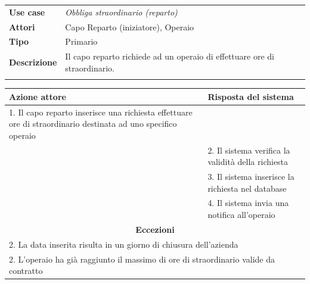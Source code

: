 \documentclass{scrreprt}
\begin{document}
	\FloatBarrier
	\begin{table}[h|]
	\centering
	\begin{tabular}{p{3cm}p{11cm}}
	\textbf{Use case} & \textit{Obbliga straordinario (reparto)} \\ 
	\textbf{Attori} & Capo Reparto (iniziatore), Operaio \\
	\textbf{Tipo} & Primario \\
	\textbf{Descrizione} & Il capo reparto richiede ad un operaio di effettuare ore di straordinario. \\
	\\
	\end{tabular}
	\centering
	\begin{tabular}{|p{7cm}|p{7cm}|}
	\hline
	\textbf{Azione attore} & \textbf{Risposta del sistema} \\ \hline
	1. Il capo reparto inserisce una richiesta effettuare ore di straordinario destinata ad uno specifico operaio &                  \\ \hline
	& 2. Il sistema verifica la validità della richiesta                  \\ \hline
	& 3. Il sistema inserisce la richiesta nel database                  \\ \hline
	& 4. Il sistema invia una notifica all'operaio                  \\ \hline
	\multicolumn{2}{|c|}{\textbf{Eccezioni}} \\ \hline
	\multicolumn{2}{|l|}{ 2. La data inserita risulta in un giorno di chiusura dell'azienda } \\ \hline
	\multicolumn{2}{|l|}{ 2. L'operaio ha già raggiunto il massimo di ore di straordinario valide da contratto } \\ \hline
	\end{tabular}
	\end{table}
	\FloatBarrier

\end{document}
